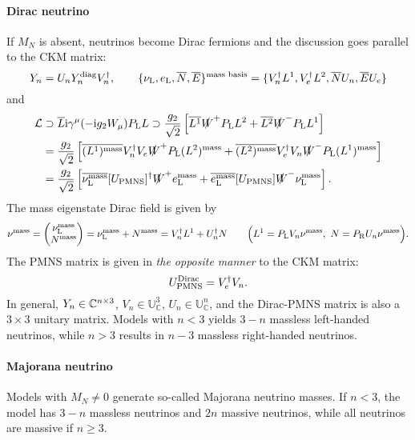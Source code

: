 \documentclass[CheatSheet]{subfiles}
\newcommand\MN[1][]{M_{N#1}}
\begin{document}
\paragraph{Dirac neutrino}
If $\MN$ is absent, neutrinos become Dirac fermions and the discussion goes parallel to the CKM matrix:
\begin{equation}
 Y_{n} = U_n Y_n^{\text{diag}} V_n^\dagger,\qquad
\{\nu_{\mathrm{L}}, e_{\mathrm{L}}, \overline N, \overline E\}^{\text{mass basis}} = \{V_n^\dagger L^1, V_e^\dagger L^2, \overline N U_n, \overline E U_e\}
\end{equation}
and
\begin{align}
 \mathcal L&\supset\overline{L}\mathrm{i}\gamma^\mu(-\mathrm{i} g_2 W_\mu)P_{\mathrm{L}} L
\supset
\frac{g_2}{\sqrt2}\left[
\overline{L^1} \slashed W^+P_{\mathrm{L}} L^2
+\overline{L^2}\slashed W^-P_{\mathrm{L}} L^1
\right]
\\&=
\frac{g_2}{\sqrt2}\left[
\overline{(L^1)^{\text{mass}}} V_n^\dagger V_e\slashed W^+P_{\mathrm{L}} (L^2)^{\text{mass}}
+\overline{(L^2)^{\text{mass}}}V_e^\dagger V_n\slashed W^-P_{\mathrm{L}}(L^1)^{\text{mass}}
\right]
\\&=
\frac{g_2}{\sqrt2}\left[
\overline{\nu_{\mathrm{L}}^{\text{mass}}} [U_{\mathrm{PMNS}}]^\dagger\slashed W^+e_{\mathrm{L}}^{\text{mass}}
+\overline{e_{\mathrm{L}}^{\text{mass}}}[U_{\mathrm{PMNS}}] \slashed W^-\nu_{\mathrm{L}}^{\text{mass}}
\right].
\end{align}
The mass eigenstate Dirac field is given by
\begin{equation}
 \nu^{\text{mass}} = \begin{pmatrix}\nu_{\mathrm{L}}^{\text{mass}}\\N^{\text{mass}}\end{pmatrix} = 
\nu_{\mathrm{L}}^{\text{mass}}+N^{\text{mass}}=
V_n^\dagger L^1 + U_n^\dagger N
\qquad
 \Bigl(L^1 = P_{\mathrm{L}} V_n \nu^{\text{mass}},~
 N = P_{\mathrm{R}} U_n \nu^{\text{mass}}\Bigr).
\end{equation}
The PMNS matrix is given in \emph{the opposite manner} to the CKM matrix:
\begin{equation}
 U_{\mathrm{PMNS}}^{\text{Dirac}}=V_e^\dagger V_n.
\end{equation}
In general, $Y_{n}\in\mathbb C^{n\times3}$, $V_n\in\mathbb U_{\mathbb C}^3$, $U_n\in\mathbb U_{\mathbb C}^n$, and the Dirac-PMNS matrix is also a $3\times 3$ unitary matrix.
Models with $n<3$ yields $3-n$ massless left-handed neutrinos, while $n>3$ results in $n-3$ massless right-handed neutrinos.


\paragraph{Majorana neutrino}
Models with $\MN\neq0$ generate so-called Majorana neutrino masses.
If $n<3$, the model has $3-n$ massless neutrinos and $2n$ massive neutrinos, while all neutrinos are massive if $n\ge 3$.
\end{document}
